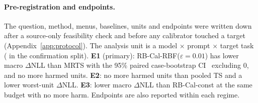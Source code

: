 \documentclass[11pt]{article}
\theoremstyle{remark}
\begin{document}
\paragraph{Pre-registration and endpoints.}
The question, method, menus, baselines, units and endpoints were written down after a source-only feasibility check and before any calibrator touched a target (Appendix~\ref{app:protocol}).
The analysis unit is a model $\times$ prompt $\times$ target task (\NConfirm{} in the confirmation split).
\textbf{E1} (primary): RB-Cal-RBF($\varepsilon{=}0.01$) has lower macro $\Delta$NLL than MRTS with the 95\% paired case-bootstrap CI~\citep{efron1994bootstrap} excluding 0, and no more harmed units.
\textbf{E2}: no more harmed units than pooled TS and a lower worst-unit $\Delta$NLL.
\textbf{E3}: lower macro $\Delta$NLL than RB-Cal-const at the same budget with no more harm.
Endpoints are also reported within each regime.
\end{document}
